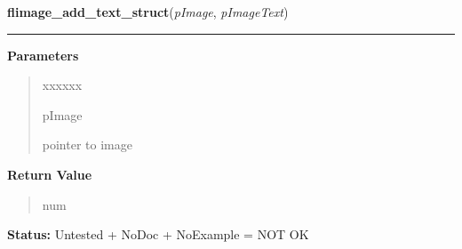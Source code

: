 \hspace{.8\funcindent}\begin{boxedminipage}{\funcwidth}

    \raggedright \textbf{flimage\_add\_text\_struct}(\textit{pImage}, \textit{pImageText})

    \vspace{-1.5ex}

    \rule{\textwidth}{0.5\fboxrule}
\setlength{\parskip}{2ex}
\setlength{\parskip}{1ex}
      \textbf{Parameters}
      \vspace{-1ex}

      \begin{quote}
        \begin{Ventry}{xxxxxx}

          \item[pImage]

          pointer to image

        \end{Ventry}

      \end{quote}

      \textbf{Return Value}
    \vspace{-1ex}

      \begin{quote}
      num

      \end{quote}

\textbf{Status:} Untested + NoDoc + NoExample = NOT OK



    \end{boxedminipage}

    \label{xformslib:library:flimage_delete_all_text}

    \vspace{0.5ex}

